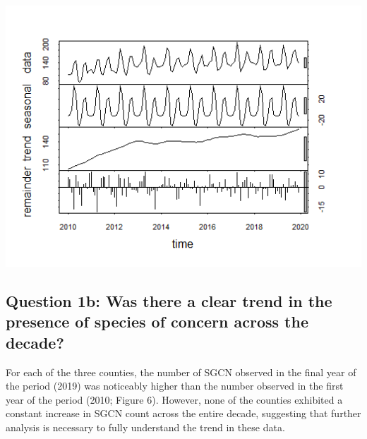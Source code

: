 \documentclass[
  12pt,
]{article}
\newenvironment{Shaded}{\begin{snugshade}}{\end{snugshade}}
\newcommand{\AttributeTok}[1]{\textcolor[rgb]{0.77,0.63,0.00}{#1}}
\newcommand{\DecValTok}[1]{\textcolor[rgb]{0.00,0.00,0.81}{#1}}
\newcommand{\FunctionTok}[1]{\textcolor[rgb]{0.00,0.00,0.00}{#1}}
\newcommand{\NormalTok}[1]{#1}
\newcommand{\OtherTok}[1]{\textcolor[rgb]{0.56,0.35,0.01}{#1}}
\newcommand{\SpecialCharTok}[1]{\textcolor[rgb]{0.00,0.00,0.00}{#1}}
\newcommand{\StringTok}[1]{\textcolor[rgb]{0.31,0.60,0.02}{#1}}
\begin{document}
\includegraphics{./Output/Wake_spp_ts_decomp.png}

\hypertarget{question-1b-was-there-a-clear-trend-in-the-presence-of-species-of-concern-across-the-decade}{%
\subsection{Question 1b: Was there a clear trend in the presence of
species of concern across the
decade?}\label{question-1b-was-there-a-clear-trend-in-the-presence-of-species-of-concern-across-the-decade}}

For each of the three counties, the number of SGCN observed in the final
year of the period (2019) was noticeably higher than the number observed
in the first year of the period (2010; Figure 6). However, none of the
counties exhibited a constant increase in SGCN count across the entire
decade, suggesting that further analysis is necessary to fully
understand the trend in these data.

\begin{Shaded}
\end{Shaded}
\end{document}
